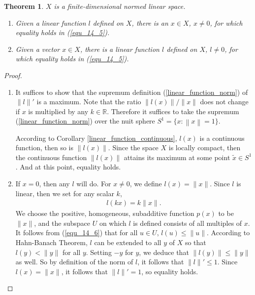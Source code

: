 \documentclass[11pt]{book}
\newtheorem{theorem}{Theorem}[chapter]
\theoremstyle{definition}
\numberwithin{equation}{chapter}
\begin{document}
\medskip

\begin{theorem}\label{equality_hold_theorem}
$X$ is a finite-dimensional normed linear space.
\begin{enumerate}[label=(\alph*)]
    \item Given a linear function $l$ defined on $X$, there is an $x \in X$, $x \neq 0$, for which equality holds in (\ref{equ_14_5}).
    
    \item Given a vector $x \in X$, there is a linear function $l$ defined on $X$, $l \neq 0$, for which equality holds in (\ref{equ_14_5}).
\end{enumerate}
\end{theorem}
\begin{proof}
~\begin{enumerate}[label=(\alph*)]
    \item It suffices to show that the supremum definition (\ref{linear_function_norm}) of $\|l\|'$ is a maximum. Note that the ratio $\|l(x)\|/\|x\|$ does not change if $x$ is multiplied by any $k \in \mathbb{R}$. Therefore it suffices to take the supremum (\ref{linear_function_norm}) over the nuit sphere $S^1 = \{x: \left\|x\right\| = 1\}$.
    
    According to Corollary \ref{linear_function_continuous}, $l(x)$ is a continuous function, then so is $\|l(x)\|$. Since the space $X$ is locally compact, then the continuous function $\|l(x)\|$ attains its maximum at some point $\widetilde{x} \in S^1$. And at this point, equality holds.
    
    \item If $x = 0$, then any $l$ will do. For $x \neq 0$, we define $l(x) = \|x\|$. Since $l$ is linear, then we set for any scalar $k$, 
    \begin{align}\label{equ_14_6}
        l(kx) = k \|x\|.
    \end{align}
    We choose the positive, homogeneous, subadditive function $p(x)$ to be $\|x\|$, and the subspace $U$ on which $l$ is defined consists of all multiples of $x$. It follows from (\ref{equ_14_6}) that for all $u \in U$, $l(u) \leq \|u\|$. According to Hahn-Banach Theorem, $l$ can be extended to all $y$ of $X$ so that $l(y) < \|y\|$ for all $y$.  Setting $-y$ for $y$, we deduce that $\left\|l(y)\right\| \leq \|y\|$ as well. So by definition of the norm of $l$, it follows that $\|l\|' \leq 1$. Since $l(x) = \|x\|$, it follows that $\|l\|' = 1$, so equality holds.
\end{enumerate}
\end{proof}
\end{document}
